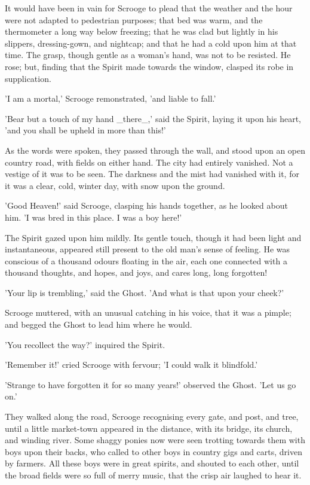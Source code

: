 It would have been in vain for Scrooge to plead that the weather and the
hour were not adapted to pedestrian purposes; that bed was warm, and the
thermometer a long way below freezing; that he was clad but lightly in
his slippers, dressing-gown, and nightcap; and that he had a cold upon
him at that time. The grasp, though gentle as a woman's hand, was not
to be resisted. He rose; but, finding that the Spirit made towards the
window, clasped its robe in supplication.

'I am a mortal,' Scrooge remonstrated, 'and liable to fall.'

'Bear but a touch of my hand _there_,' said the Spirit, laying it upon
his heart, 'and you shall be upheld in more than this!'

As the words were spoken, they passed through the wall, and stood upon
an open country road, with fields on either hand. The city had entirely
vanished. Not a vestige of it was to be seen. The darkness and the mist
had vanished with it, for it was a clear, cold, winter day, with snow
upon the ground.

'Good Heaven!' said Scrooge, clasping his hands together, as he looked
about him. 'I was bred in this place. I was a boy here!'

The Spirit gazed upon him mildly. Its gentle touch, though it had been
light and instantaneous, appeared still present to the old man's sense
of feeling. He was conscious of a thousand odours floating in the air,
each one connected with a thousand thoughts, and hopes, and joys, and
cares long, long forgotten!

'Your lip is trembling,' said the Ghost. 'And what is that upon your
cheek?'

Scrooge muttered, with an unusual catching in his voice, that it was a
pimple; and begged the Ghost to lead him where he would.

'You recollect the way?' inquired the Spirit.

'Remember it!' cried Scrooge with fervour; 'I could walk it blindfold.'

'Strange to have forgotten it for so many years!' observed the Ghost.
'Let us go on.'

They walked along the road, Scrooge recognising every gate, and post,
and tree, until a little market-town appeared in the distance, with its
bridge, its church, and winding river. Some shaggy ponies now were seen
trotting towards them with boys upon their backs, who called to other
boys in country gigs and carts, driven by farmers. All these boys were
in great spirits, and shouted to each other, until the broad fields were
so full of merry music, that the crisp air laughed to hear it.


